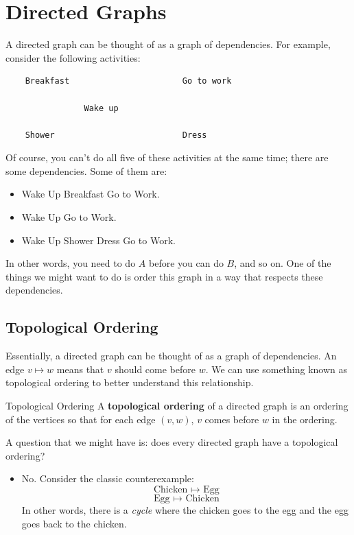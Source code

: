 \documentclass[letterpaper]{article}
\begin{document}
\section{Directed Graphs}
A directed graph can be thought of as a graph of dependencies. For example, consider the following activities:
\begin{verbatim}
    Breakfast                       Go to work

                Wake up 

    Shower                          Dress 
\end{verbatim}
Of course, you can't do all five of these activities at the same time; there are some dependencies. Some of them are: 
\begin{itemize}
    \item Wake Up \textrightarrow{} Breakfast \textrightarrow{} Go to Work. 
    \item Wake Up \textrightarrow{} Go to Work. 
    \item Wake Up \textrightarrow{} Shower \textrightarrow{} Dress \textrightarrow{} Go to Work. 
\end{itemize}
In other words, you need to do $A$ before you can do $B$, and so on. One of the things we might want to do is order this graph in a way that respects these dependencies.

\subsection{Topological Ordering}
Essentially, a directed graph can be thought of as a graph of dependencies. An edge $v \mapsto w$ means that $v$ should come before $w$. We can use something known as topological ordering to better understand this relationship.

\begin{definition}{Topological Ordering}{}
    A \textbf{topological ordering} of a directed graph is an ordering of the vertices so that for each edge $(v, w)$, $v$ comes before $w$ in the ordering.
\end{definition}
A question that we might have is: does every directed graph have a topological ordering?
\begin{itemize}
    \item No. Consider the classic counterexample:
    \[\text{Chicken } \mapsto \text{ Egg}\]
    \[\text{Egg } \mapsto \text{ Chicken}\]
    In other words, there is a \emph{cycle} where the chicken goes to the egg and the egg goes back to the chicken. 
\end{itemize}
\end{document}
